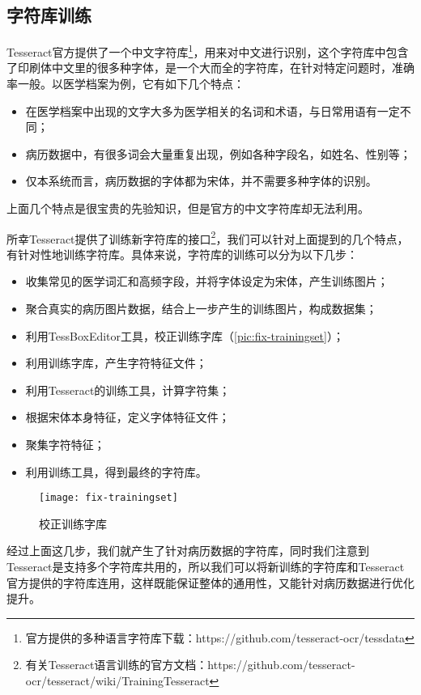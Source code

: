 \subsection{字符库训练}
Tesseract官方提供了一个中文字符库\footnote{官方提供的多种语言字符库下载：https://github.com/tesseract-ocr/tessdata}，用来对中文进行识别，这个字符库中包含了印刷体中文里的很多种字体，是一个大而全的字符库，在针对特定问题时，准确率一般。以医学档案为例，它有如下几个特点：
\begin{itemize}
	\item 在医学档案中出现的文字大多为医学相关的名词和术语，与日常用语有一定不同；
	\item 病历数据中，有很多词会大量重复出现，例如各种字段名，如姓名、性别等；
	\item 仅本系统而言，病历数据的字体都为宋体，并不需要多种字体的识别。
\end{itemize}
上面几个特点是很宝贵的先验知识，但是官方的中文字符库却无法利用。

所幸Tesseract提供了训练新字符库的接口\footnote{有关Tesseract语言训练的官方文档：https://github.com/tesseract-ocr/tesseract/wiki/TrainingTesseract}，我们可以针对上面提到的几个特点，有针对性地训练字符库。具体来说，字符库的训练可以分为以下几步：
\begin{itemize}
	\item 收集常见的医学词汇和高频字段，并将字体设定为宋体，产生训练图片；
	\item 聚合真实的病历图片数据，结合上一步产生的训练图片，构成数据集；
	\item 利用TessBoxEditor工具，校正训练字库（\autoref{pic:fix-trainingset}）；
	\item 利用训练字库，产生字符特征文件；
	\item 利用Tesseract的训练工具，计算字符集；
	\item 根据宋体本身特征，定义字体特征文件；
	\item 聚集字符特征；
	\item 利用训练工具，得到最终的字符库。
\end{itemize}

\begin{figure}[htbp]
	\centering
	\caption{校正训练字库}
	\texttt{[image: fix-trainingset]}
	\label{pic:fix-trainingset}
\end{figure}
经过上面这几步，我们就产生了针对病历数据的字符库，同时我们注意到Tesseract是支持多个字符库共用的，所以我们可以将新训练的字符库和Tesseract官方提供的字符库连用，这样既能保证整体的通用性，又能针对病历数据进行优化提升。


